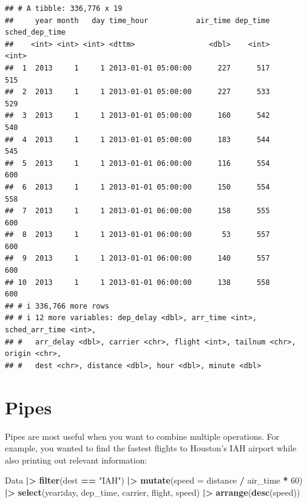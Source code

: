 \documentclass[
]{book}
\newenvironment{Shaded}{\begin{snugshade}}{\end{snugshade}}
\newcommand{\AttributeTok}[1]{\textcolor[rgb]{0.13,0.29,0.53}{#1}}
\newcommand{\DecValTok}[1]{\textcolor[rgb]{0.00,0.00,0.81}{#1}}
\newcommand{\FunctionTok}[1]{\textcolor[rgb]{0.13,0.29,0.53}{\textbf{#1}}}
\newcommand{\NormalTok}[1]{#1}
\newcommand{\SpecialCharTok}[1]{\textcolor[rgb]{0.81,0.36,0.00}{\textbf{#1}}}
\newcommand{\StringTok}[1]{\textcolor[rgb]{0.31,0.60,0.02}{#1}}
\theoremstyle{definition}
\theoremstyle{definition}
\theoremstyle{definition}
\theoremstyle{definition}
\theoremstyle{remark}
\begin{document}
\begin{verbatim}
## # A tibble: 336,776 x 19
##     year month   day time_hour           air_time dep_time sched_dep_time
##    <int> <int> <int> <dttm>                 <dbl>    <int>          <int>
##  1  2013     1     1 2013-01-01 05:00:00      227      517            515
##  2  2013     1     1 2013-01-01 05:00:00      227      533            529
##  3  2013     1     1 2013-01-01 05:00:00      160      542            540
##  4  2013     1     1 2013-01-01 05:00:00      183      544            545
##  5  2013     1     1 2013-01-01 06:00:00      116      554            600
##  6  2013     1     1 2013-01-01 05:00:00      150      554            558
##  7  2013     1     1 2013-01-01 06:00:00      158      555            600
##  8  2013     1     1 2013-01-01 06:00:00       53      557            600
##  9  2013     1     1 2013-01-01 06:00:00      140      557            600
## 10  2013     1     1 2013-01-01 06:00:00      138      558            600
## # i 336,766 more rows
## # i 12 more variables: dep_delay <dbl>, arr_time <int>, sched_arr_time <int>,
## #   arr_delay <dbl>, carrier <chr>, flight <int>, tailnum <chr>, origin <chr>,
## #   dest <chr>, distance <dbl>, hour <dbl>, minute <dbl>
\end{verbatim}

\hypertarget{pipes}{%
\section{Pipes}\label{pipes}}

Pipes are most useful when you want to combine multiple operations. For example, you wanted to find the fastest flights to Houston's IAH airport while also printing out relevant information:

\begin{Shaded}
\begin{Highlighting}[]
\NormalTok{Data }\SpecialCharTok{|\textgreater{}} 
  \FunctionTok{filter}\NormalTok{(dest }\SpecialCharTok{==} \StringTok{"IAH"}\NormalTok{) }\SpecialCharTok{|\textgreater{}} 
  \FunctionTok{mutate}\NormalTok{(}\AttributeTok{speed =}\NormalTok{ distance }\SpecialCharTok{/}\NormalTok{ air\_time }\SpecialCharTok{*} \DecValTok{60}\NormalTok{) }\SpecialCharTok{|\textgreater{}} 
  \FunctionTok{select}\NormalTok{(year}\SpecialCharTok{:}\NormalTok{day, dep\_time, carrier, flight, speed) }\SpecialCharTok{|\textgreater{}} 
  \FunctionTok{arrange}\NormalTok{(}\FunctionTok{desc}\NormalTok{(speed))}
\end{Highlighting}
\end{Shaded}
\end{document}
